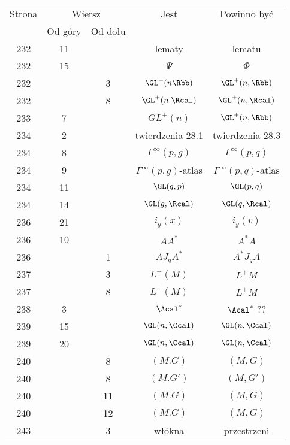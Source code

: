 \documentclass[a4paper,11pt]{article}
\numberwithin{equation}{section}
\begin{document}
\begin{center}
  \begin{tabular}{|c|c|c|c|c|}
    \hline
    Strona & \multicolumn{2}{c|}{Wiersz} & Jest
                              & Powinno być \\ \cline{2-3}
    & Od góry & Od dołu & & \\
    \hline
    232 & 11 & & lematy & lematu \\
    232 & 15 & & $\Psi$ & $\Phi$ \\
    232 & & \hphantom{0}3 & $\GL^{ + }( n \Rbb )$ & $\GL^{ + }( n, \Rbb )$ \\
    232 & & \hphantom{0}8 & $\GL^{ + }( n. \Rcal )$
    & $\GL^{ + }( n, \Rcal )$ \\
    233 & \hphantom{0}7 & & $GL^{ + }( n )$ & $\GL^{ + }( n, \Rbb )$ \\
    234 & \hphantom{0}2 & & twierdzenia 28.1 & twierdzenia 28.3 \\
    234 & \hphantom{0}8 & & $\Gamma^{ \infty }( p, g )$ & $\Gamma^{ \infty }( p, q )$ \\
    234 & \hphantom{0}9 & & $\Gamma^{ \infty }( p, g )$-atlas
           & $\Gamma^{ \infty }( p, q )$-atlas \\
    234 & 11 & & $\GL( q, p )$ & $\GL( p, q )$ \\
    234 & 14 & & $\GL( g, \Rcal )$ & $\GL( q, \Rcal )$ \\
    236 & 21 & & $i_{ g }( x )$ & $i_{ g }( v )$ \\
    236 & 10 & & $A A^{ * }$ & $A^{ * } A$ \\
    236 & & \hphantom{0}1 & $A J_{ q } A^{ * }$ & $A^{ * } J_{ q } A$ \\
    237 & & \hphantom{0}3 & $L^{ + }( M )$ & $L^{ + }M$ \\
    237 & & \hphantom{0}8 & $L^{ + }( M )$ & $L^{ + }M$ \\
    238 & \hphantom{0}3 & & $\Acal^{ * }$ & $\Acal^{ * }$ ?? \\
    239 & 15 & & $\GL( n, \Ccal )$ & $\GL( n, \Ccal )$ \\
    239 & 20 & & $\GL( n, \Ccal )$ & $\GL( n, \Ccal )$ \\
    240 & & \hphantom{0}8 & $( M. G )$ & $( M, G )$ \\
    240 & & \hphantom{0}8 & $( M. G' )$ & $( M, G' )$ \\
    240 & & 11 & $( M. G )$ & $( M, G )$ \\
    240 & & 12 & $( M. G )$ & $( M, G )$ \\
    243 & & \hphantom{0}3 & włókna & przestrzeni \\

\end{tabular}
\end{center}
\end{document}
